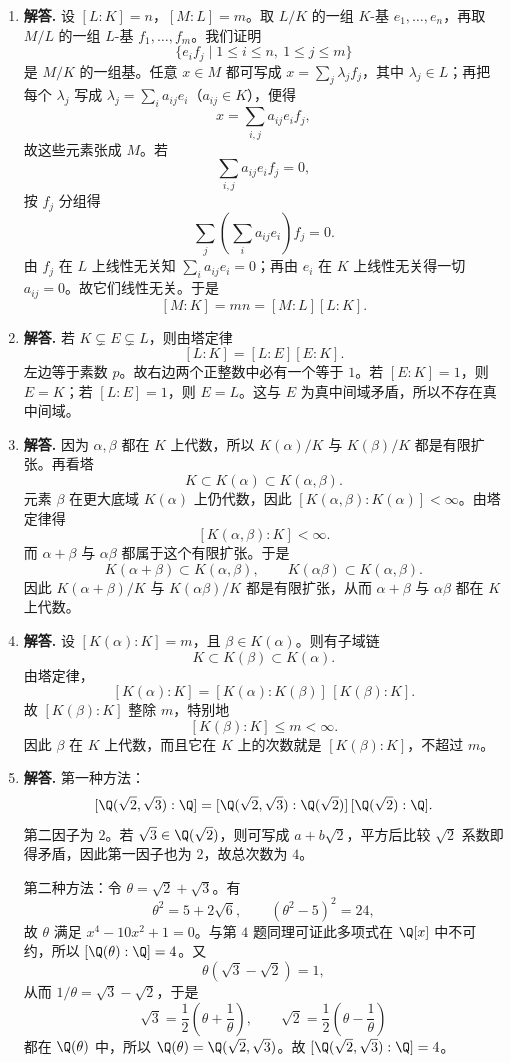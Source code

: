 \begin{enumerate}[label=\textbf{\arabic*.}, leftmargin=*, itemsep=1em]
\item \textbf{解答.} 设 $[L:K]=n$，$[M:L]=m$。取 $L/K$ 的一组 $K$-基 $e_1,\dots,e_n$，再取 $M/L$ 的一组 $L$-基 $f_1,\dots,f_m$。我们证明
\[
\{e_if_j\mid 1\le i\le n,\ 1\le j\le m\}
\]
是 $M/K$ 的一组基。任意 $x\in M$ 都可写成 $x=\sum_j \lambda_j f_j$，其中 $\lambda_j\in L$；再把每个 $\lambda_j$ 写成 $\lambda_j=\sum_i a_{ij}e_i$（$a_{ij}\in K$），便得
\[
x=\sum_{i,j}a_{ij}e_if_j,
\]
故这些元素张成 $M$。若
\[
\sum_{i,j}a_{ij}e_if_j=0,
\]
按 $f_j$ 分组得
\[
\sum_j\left(\sum_i a_{ij}e_i\right)f_j=0.
\]
由 $f_j$ 在 $L$ 上线性无关知 $\sum_i a_{ij}e_i=0$；再由 $e_i$ 在 $K$ 上线性无关得一切 $a_{ij}=0$。故它们线性无关。于是
\[
[M:K]=mn=[M:L][L:K].
\]

\item \textbf{解答.} 若 $K\subsetneq E\subsetneq L$，则由塔定律
\[
[L:K]=[L:E][E:K].
\]
左边等于素数 $p$。故右边两个正整数中必有一个等于 $1$。若 $[E:K]=1$，则 $E=K$；若 $[L:E]=1$，则 $E=L$。这与 $E$ 为真中间域矛盾，所以不存在真中间域。

\item \textbf{解答.} 因为 $\alpha,\beta$ 都在 $K$ 上代数，所以 $K(\alpha)/K$ 与 $K(\beta)/K$ 都是有限扩张。再看塔
\[
K\subset K(\alpha)\subset K(\alpha,\beta).
\]
元素 $\beta$ 在更大底域 $K(\alpha)$ 上仍代数，因此 $[K(\alpha,\beta):K(\alpha)]<\infty$。由塔定律得
\[
[K(\alpha,\beta):K]<\infty.
\]
而 $\alpha+\beta$ 与 $\alpha\beta$ 都属于这个有限扩张。于是
\[
K(\alpha+\beta)\subset K(\alpha,\beta),
\qquad
K(\alpha\beta)\subset K(\alpha,\beta).
\]
因此 $K(\alpha+\beta)/K$ 与 $K(\alpha\beta)/K$ 都是有限扩张，从而 $\alpha+\beta$ 与 $\alpha\beta$ 都在 $K$ 上代数。

\item \textbf{解答.} 设 $[K(\alpha):K]=m$，且 $\beta\in K(\alpha)$。则有子域链
\[
K\subset K(\beta)\subset K(\alpha).
\]
由塔定律，
\[
[K(\alpha):K]=[K(\alpha):K(\beta)]\,[K(\beta):K].
\]
故 $[K(\beta):K]$ 整除 $m$，特别地
\[
[K(\beta):K]\le m<\infty.
\]
因此 $\beta$ 在 $K$ 上代数，而且它在 $K$ 上的次数就是 $[K(\beta):K]$，不超过 $m$。

\item \textbf{解答.} 第一种方法：
\[
[\Q(\sqrt2,\sqrt3):\Q]=[\Q(\sqrt2,\sqrt3):\Q(\sqrt2)]\,[\Q(\sqrt2):\Q].
\]
第二因子为 $2$。若 $\sqrt3\in\Q(\sqrt2)$，则可写成 $a+b\sqrt2$，平方后比较 $\sqrt2$ 系数即得矛盾，因此第一因子也为 $2$，故总次数为 $4$。

第二种方法：令 $\theta=\sqrt2+\sqrt3$。有
\[
\theta^2=5+2\sqrt6,
\qquad (\theta^2-5)^2=24,
\]
故 $\theta$ 满足 $x^4-10x^2+1=0$。与第 $4$ 题同理可证此多项式在 $\Q[x]$ 中不可约，所以 $[\Q(\theta):\Q]=4$。又
\[
\theta(\sqrt3-\sqrt2)=1,
\]
从而 $1/\theta=\sqrt3-\sqrt2$，于是
\[
\sqrt3=\frac12\left(\theta+\frac1\theta\right),
\qquad
\sqrt2=\frac12\left(\theta-\frac1\theta\right)
\]
都在 $\Q(\theta)$ 中，所以 $\Q(\theta)=\Q(\sqrt2,\sqrt3)$。故 $[\Q(\sqrt2,\sqrt3):\Q]=4$。


\end{enumerate}

